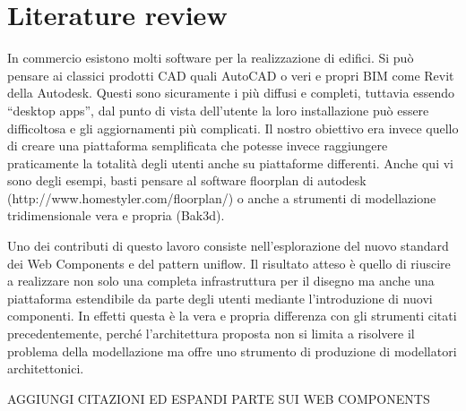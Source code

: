 \section{Literature review}

In commercio esistono molti software per la realizzazione di edifici. Si può pensare ai classici prodotti CAD quali AutoCAD o veri e propri BIM come Revit della Autodesk. Questi sono sicuramente i più diffusi e completi, tuttavia essendo “desktop apps”, dal punto di vista dell’utente la loro installazione può essere difficoltosa e gli aggiornamenti più complicati. Il nostro obiettivo era invece quello di creare una piattaforma semplificata che potesse invece raggiungere praticamente la totalità degli utenti anche su piattaforme differenti. Anche qui vi sono degli esempi, basti pensare al software floorplan di autodesk (http://www.homestyler.com/floorplan/) o anche a strumenti di modellazione tridimensionale vera e propria (Bak3d). 


Uno dei contributi di questo lavoro consiste nell’esplorazione del nuovo standard dei Web Components e del pattern uniflow. Il risultato atteso è quello di riuscire a realizzare non solo una completa infrastruttura per il disegno ma anche una piattaforma estendibile da parte degli utenti mediante l’introduzione di nuovi componenti. In effetti questa è la vera e propria differenza con gli strumenti citati precedentemente, perché l’architettura proposta non si limita a risolvere il problema della modellazione ma offre uno strumento di produzione di modellatori architettonici.


AGGIUNGI CITAZIONI ED ESPANDI PARTE SUI WEB COMPONENTS